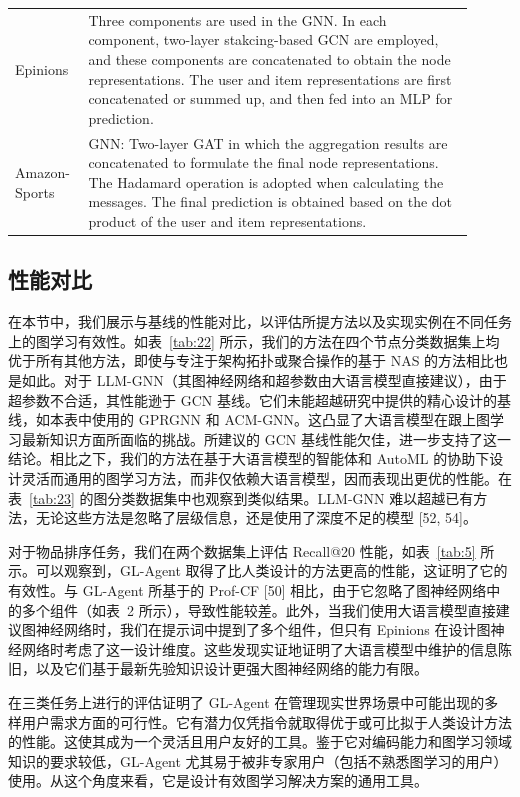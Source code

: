 \documentclass[11pt,UTF8,fontset=fandol]{ctexart}
\begin{document}
\begin{table}[H]
\begin{tabular}{p{0.13\linewidth} p{0.78\linewidth}}
Epinions & Three components are used in the GNN. In each component, two-layer stakcing-based GCN are employed, and these components are concatenated to obtain the node representations. The user and item representations are first concatenated or summed up, and then fed into an MLP for prediction. \\
Amazon-Sports & GNN: Two-layer GAT in which the aggregation results are concatenated to formulate the final node representations. The Hadamard operation is adopted when calculating the messages. The final prediction is obtained based on the dot product of the user and item representations. \\
\bottomrule
\end{tabular}
\end{table}

\subsection{性能对比}

在本节中，我们展示与基线的性能对比，以评估所提方法以及实现实例在不同任务上的图学习有效性。如表~\ref{tab:22} 所示，我们的方法在四个节点分类数据集上均优于所有其他方法，即使与专注于架构拓扑或聚合操作的基于 NAS 的方法相比也是如此。对于 LLM-GNN（其图神经网络和超参数由大语言模型直接建议），由于超参数不合适，其性能逊于 GCN 基线。它们未能超越研究中提供的精心设计的基线，如本表中使用的 GPRGNN 和 ACM-GNN。这凸显了大语言模型在跟上图学习最新知识方面所面临的挑战。所建议的 GCN 基线性能欠佳，进一步支持了这一结论。相比之下，我们的方法在基于大语言模型的智能体和 AutoML 的协助下设计灵活而通用的图学习方法，而非仅依赖大语言模型，因而表现出更优的性能。在表~\ref{tab:23} 的图分类数据集中也观察到类似结果。LLM-GNN 难以超越已有方法，无论这些方法是忽略了层级信息，还是使用了深度不足的模型 [52, 54]。

对于物品排序任务，我们在两个数据集上评估 Recall@20 性能，如表~\ref{tab:5} 所示。可以观察到，GL-Agent 取得了比人类设计的方法更高的性能，这证明了它的有效性。与 GL-Agent 所基于的 Prof-CF [50] 相比，由于它忽略了图神经网络中的多个组件（如表~2 所示），导致性能较差。此外，当我们使用大语言模型直接建议图神经网络时，我们在提示词中提到了多个组件，但只有 Epinions 在设计图神经网络时考虑了这一设计维度。这些发现实证地证明了大语言模型中维护的信息陈旧，以及它们基于最新先验知识设计更强大图神经网络的能力有限。

在三类任务上进行的评估证明了 GL-Agent 在管理现实世界场景中可能出现的多样用户需求方面的可行性。它有潜力仅凭指令就取得优于或可比拟于人类设计方法的性能。这使其成为一个灵活且用户友好的工具。鉴于它对编码能力和图学习领域知识的要求较低，GL-Agent 尤其易于被非专家用户（包括不熟悉图学习的用户）使用。从这个角度来看，它是设计有效图学习解决方案的通用工具。
\end{document}
